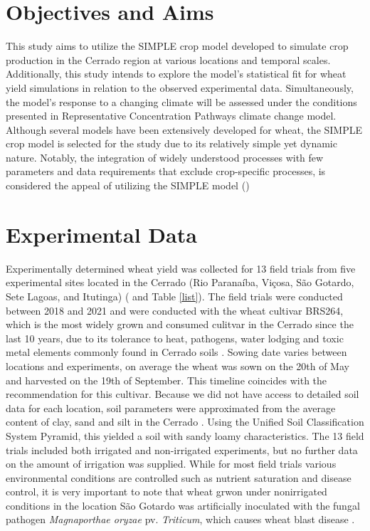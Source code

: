 \documentclass[11pt]{article}
\begin{document}
\section{Objectives and Aims}
\label{sec:org6248c41}
This study aims to utilize the SIMPLE crop model developed \cite{zhao-2019-simpl-crop-model} to simulate crop production in the Cerrado region at various locations and temporal scales. Additionally, this study intends to explore the model’s statistical fit for wheat yield simulations in relation to the observed experimental data.
Simultaneously, the model’s response to a changing climate will be assessed under the conditions presented in Representative Concentration Pathways climate change model. Although several models have been extensively developed for wheat, the SIMPLE crop model is selected for the study due to its relatively simple yet dynamic nature. Notably, the integration of widely understood processes with few parameters and data requirements that exclude crop-specific processes, is considered the appeal of utilizing the SIMPLE model (\cite{zhao-2019-simpl-crop-model})

\section{Experimental Data}
\label{sec:orgb2f11f4}
Experimentally determined wheat yield was collected for 13 field trials from five experimental sites located in the Cerrado (Rio Paranaíba, Viçosa, São Gotardo, Sete Lagoas, and Itutinga) (\cite{casagrande-2023-new-brazil} and Table \ref{list}). The field trials were conducted between 2018 and 2021 and were conducted with the wheat cultivar BRS264, which is the most widely grown and consumed culitvar in the Cerrado since the last 10 years, due to its tolerance to heat, pathogens, water lodging and toxic metal elements commonly found in Cerrado soils \cite{albrecht-2021-cultiv-trigo}.
Sowing date varies between locations and experiments, on average the wheat was sown on the 20th of May and harvested on the 19th of September. This timeline coincides with the recommendation for this cultivar. Because we did not have access to detailed soil data for each location, soil parameters were approximated from the average content of clay, sand and silt in the Cerrado \cite{lopes-2016-chapt-one}. Using the Unified Soil Classification System Pyramid, this yielded a soil with sandy loamy characteristics. The 13 field trials included both irrigated and non-irrigated experiments, but no further data on the amount of irrigation was supplied. While for most field trials various environmental conditions are controlled such as nutrient saturation and disease control, it is very important to note that wheat grwon under nonirrigated conditions in the location São Gotardo was artificially inoculated with the fungal pathogen \emph{Magnaporthae oryzae} pv. \emph{Triticum}, which causes wheat blast disease \cite{albrecht-2021-cultiv-trigo}.
\end{document}

